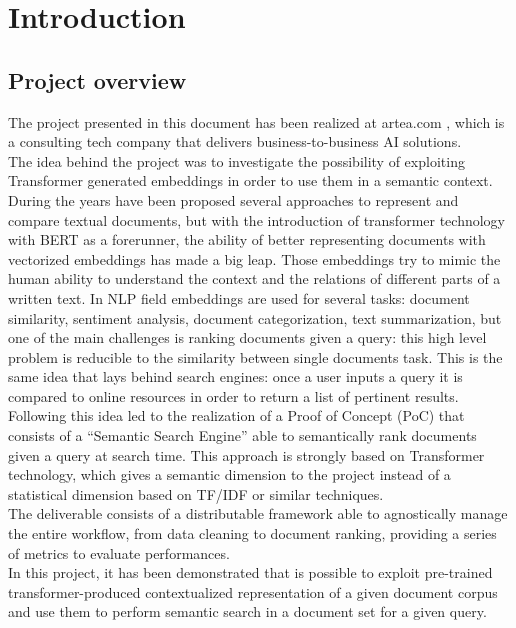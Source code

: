 \documentclass[\main/main.tex]{subfiles}
\begin{document}
\chapter*{Introduction}
\section*{Project overview}
The project presented in this document has been realized at artea.com \cite{artea}, which is a consulting tech company that delivers business-to-business AI solutions. \\
The idea behind the project was to investigate the possibility of exploiting Transformer generated embeddings in order to use them in a semantic context. During the years have been proposed several approaches to represent and compare textual documents, but with the introduction of transformer technology with BERT as a forerunner, the ability of better representing documents with vectorized embeddings has made a big leap. Those embeddings try to mimic the human ability to understand the context and the relations of different parts of a written text. In NLP field embeddings are used for several tasks: document similarity, sentiment analysis, document categorization, text summarization, but one of the main challenges is ranking documents given a query: this high level problem is reducible to the similarity between single documents task. This is the same idea that lays behind search engines: once a user inputs a query it is compared to online resources in order to return a list of pertinent results. \\
Following this idea led to the realization of a Proof of Concept (PoC) that consists of a ``Semantic Search Engine'' able to semantically rank documents given a query at search time. This approach is strongly based on Transformer technology, which gives a semantic dimension to the project instead of a statistical dimension based on TF/IDF or similar techniques. \\
The deliverable consists of a distributable framework able to agnostically manage the entire workflow, from data cleaning to document ranking, providing a series of metrics to evaluate performances. \\
In this project, it has been demonstrated that is possible to exploit pre-trained transformer-produced contextualized representation of a given document corpus and use them to perform semantic search in a document set for a given query. 
\end{document}
